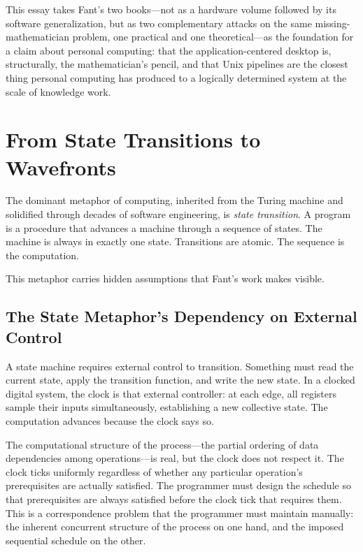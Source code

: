 \documentclass[12pt, a4paper]{article}
\begin{document}
This essay takes Fant's two books---not as a hardware volume
followed by its software generalization, but as two complementary
attacks on the same missing-mathematician problem, one practical
and one theoretical---as the foundation for a claim about personal
computing: that the application-centered desktop is, structurally,
the mathematician's pencil, and that Unix pipelines are the closest
thing personal computing has produced to a logically determined
system at the scale of knowledge work.

\section{From State Transitions to Wavefronts}

The dominant metaphor of computing, inherited from the Turing machine
and solidified through decades of software engineering, is
\emph{state transition}. A program is a procedure that advances a
machine through a sequence of states. The machine is always in exactly
one state. Transitions are atomic. The sequence is the computation.

This metaphor carries hidden assumptions that Fant's work makes visible.

\subsection{The State Metaphor's Dependency on External Control}

A state machine requires external control to transition. Something
must read the current state, apply the transition function, and write
the new state. In a clocked digital system, the clock is that external
controller: at each edge, all registers sample their inputs
simultaneously, establishing a new collective state. The computation
advances because the clock says so.

The computational structure of the process---the partial ordering of
data dependencies among operations---is real, but the clock does not
respect it. The clock ticks uniformly regardless of whether any
particular operation's prerequisites are actually satisfied. The
programmer must design the schedule so that prerequisites are always
satisfied before the clock tick that requires them. This is a
correspondence problem that the programmer must maintain manually:
the inherent concurrent structure of the process on one hand, and the
imposed sequential schedule on the other.
\end{document}
